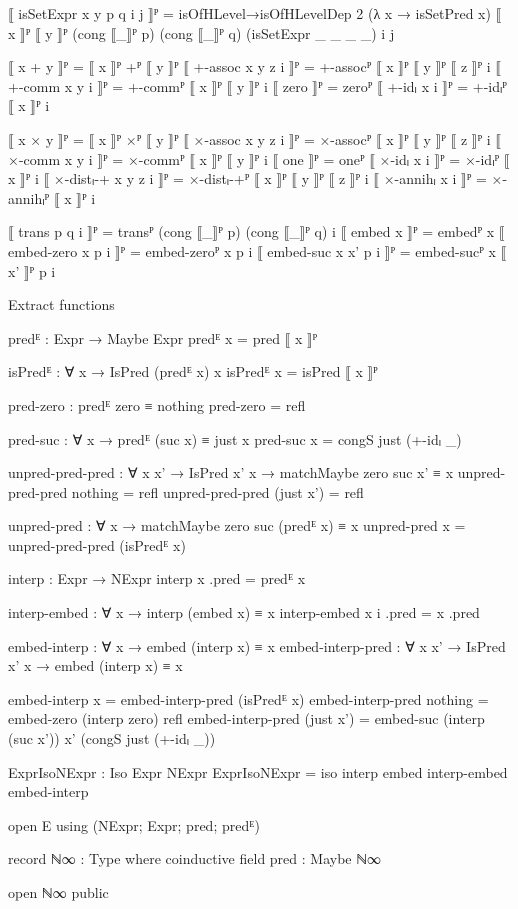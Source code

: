 \begin{code}[hide]
  ⟦ isSetExpr x y p q i j ⟧ᴾ =
    isOfHLevel→isOfHLevelDep 2 (λ x → isSetPred x)
      ⟦ x ⟧ᴾ ⟦ y ⟧ᴾ (cong ⟦_⟧ᴾ p) (cong ⟦_⟧ᴾ q) (isSetExpr _ _ _ _) i j

  ⟦ x + y ⟧ᴾ = ⟦ x ⟧ᴾ +ᴾ ⟦ y ⟧ᴾ
  ⟦ +-assoc x y z i ⟧ᴾ = +-assocᴾ ⟦ x ⟧ᴾ ⟦ y ⟧ᴾ ⟦ z ⟧ᴾ i
  ⟦ +-comm x y i ⟧ᴾ = +-commᴾ ⟦ x ⟧ᴾ ⟦ y ⟧ᴾ i
  ⟦ zero ⟧ᴾ = zeroᴾ
  ⟦ +-idₗ x i ⟧ᴾ = +-idₗᴾ ⟦ x ⟧ᴾ i

  ⟦ x × y ⟧ᴾ = ⟦ x ⟧ᴾ ×ᴾ ⟦ y ⟧ᴾ
  ⟦ ×-assoc x y z i ⟧ᴾ = ×-assocᴾ ⟦ x ⟧ᴾ ⟦ y ⟧ᴾ ⟦ z ⟧ᴾ i
  ⟦ ×-comm x y i ⟧ᴾ = ×-commᴾ ⟦ x ⟧ᴾ ⟦ y ⟧ᴾ i
  ⟦ one ⟧ᴾ = oneᴾ
  ⟦ ×-idₗ x i ⟧ᴾ = ×-idₗᴾ ⟦ x ⟧ᴾ i
  ⟦ ×-distₗ-+ x y z i ⟧ᴾ = ×-distₗ-+ᴾ ⟦ x ⟧ᴾ ⟦ y ⟧ᴾ ⟦ z ⟧ᴾ i
  ⟦ ×-annihₗ x i ⟧ᴾ = ×-annihₗᴾ ⟦ x ⟧ᴾ i

  ⟦ trans p q i ⟧ᴾ = transᴾ (cong ⟦_⟧ᴾ p) (cong ⟦_⟧ᴾ q) i
  ⟦ embed x ⟧ᴾ = embedᴾ x
  ⟦ embed-zero x p i ⟧ᴾ = embed-zeroᴾ x p i
  ⟦ embed-suc x x' p i ⟧ᴾ = embed-sucᴾ x ⟦ x' ⟧ᴾ p i
\end{code}
Extract functions
\begin{code}
  predᴱ : Expr → Maybe Expr
  predᴱ x = pred ⟦ x ⟧ᴾ

  isPredᴱ : ∀ x → IsPred (predᴱ x) x
  isPredᴱ x = isPred ⟦ x ⟧ᴾ
\end{code}
\begin{code}[hide]
  pred-zero : predᴱ zero ≡ nothing
  pred-zero = refl

  pred-suc : ∀ x → predᴱ (suc x) ≡ just x
  pred-suc x = congS just (+-idₗ _)

  unpred-pred-pred : ∀ {x x'} → IsPred x' x → matchMaybe zero suc x' ≡ x
  unpred-pred-pred nothing = refl
  unpred-pred-pred (just x') = refl

  unpred-pred : ∀ x → matchMaybe zero suc (predᴱ x) ≡ x
  unpred-pred x = unpred-pred-pred (isPredᴱ x)

  interp : Expr → NExpr
  interp x .pred = predᴱ x

  interp-embed : ∀ x → interp (embed x) ≡ x
  interp-embed x i .pred = x .pred

  embed-interp : ∀ x → embed (interp x) ≡ x
  embed-interp-pred : ∀ {x x'} → IsPred x' x → embed (interp x) ≡ x

  embed-interp x = embed-interp-pred (isPredᴱ x)
  embed-interp-pred nothing = embed-zero (interp zero) refl
  embed-interp-pred (just x') =
    embed-suc (interp (suc x')) x' (congS just (+-idₗ _))

  ExprIsoNExpr : Iso Expr NExpr
  ExprIsoNExpr = iso interp embed interp-embed embed-interp

open E using (NExpr; Expr; pred; predᴱ)

record ℕ∞ : Type where
  coinductive
  field pred : Maybe ℕ∞

open ℕ∞ public
\end{code}
